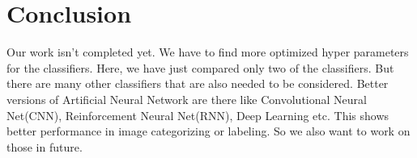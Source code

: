 \documentclass[12pt,a4paper]{article}
\begin{document}
\section{Conclusion}
Our work isn't completed yet. We have to find more optimized hyper parameters for the classifiers. Here, we have just compared only two of the classifiers. But there are many other classifiers that are also needed to be considered. Better versions of Artificial Neural Network are there like Convolutional Neural Net(CNN), Reinforcement Neural Net(RNN), Deep Learning etc. This shows better performance in image categorizing or labeling. So we also want to work on those in future.


 

\end{document}
